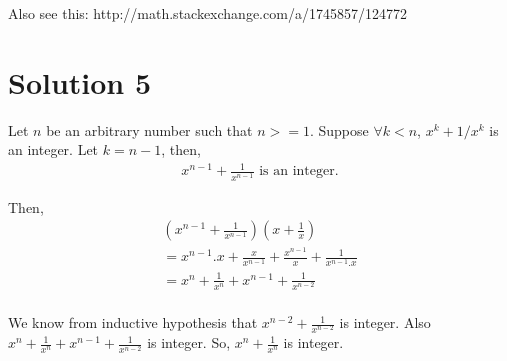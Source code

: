 \documentclass{article}
\begin{document}
Also see this: http://math.stackexchange.com/a/1745857/124772

\section{Solution 5}

Let $n$ be an arbitrary number such that $n >= 1$. Suppose $\forall k < n$, $x^k + 1/x^k$ is an integer. Let $k = n-1$, then,
\begin{gather*}
  x^{n-1} + \frac{1}{x^{n-1}} \text{ is an integer.}
\end{gather*}

Then,
\begin{gather*}
  (x^{n-1} + \frac{1}{x^{n-1}})(x + \frac{1}{x}) \\
  = x^{n-1}.x + \frac{x}{x^{n-1}} + \frac{x^{n-1}}{x} + \frac{1}{x^{n-1}.x} \\
  = x^n + \frac{1}{x^n} + x^{n-1} + \frac{1}{x^{n-2}} \\
\end{gather*}

We know from inductive hypothesis that $x^{n-2} + \frac{1}{x^{n-2}}$  is integer. Also $x^n + \frac{1}{x^n} + x^{n-1} + \frac{1}{x^{n-2}}$ is integer. So, $x^n + \frac{1}{x^n}$ is integer.
\end{document}
